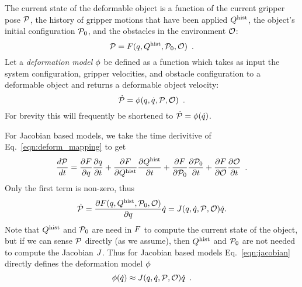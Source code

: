 The current state of the deformable object is a function of the current gripper pose $\mathcal{P}$, the history of gripper motions that have been applied $Q^{\textrm{hist}}$, the object's initial configuration $\mathcal{P}_0$, and the obstacles in the environment $\mathcal{O}$:
\begin{equation}
    \mathcal{P} = F(q, Q^{\textrm{hist}}, \mathcal{P}_0, \mathcal{O}) \enspace.
    \label{eqn:deform_mapping}
\end{equation}
Let a \textit{deformation model} $\phi$ be defined as a function which takes as input the system configuration, gripper velocities, and obstacle configuration to a deformable object and returns a deformable object velocity:
\begin{equation}
    \dot{\mathcal{P}} = \phi(q, \dot{q}, \mathcal{P}, \mathcal{O}) \enspace .
\end{equation}
For brevity this will frequently be shortened to $\dot{\mathcal{P}} = \phi(\dot{q})$.

For Jacobian based models, we take the time derivitive of Eq.~\eqref{eqn:deform_mapping} to get
\begin{equation}
\frac{d \mathcal{P}}{d t} = 
    \frac{\partial F}{\partial q}  \frac{\partial q}{\partial t} + 
    \frac{\partial F}{\partial Q^{\textrm{hist}}}\frac{\partial Q^{\textrm{hist}}}{\partial t} + 
    \frac{\partial F}{\partial \mathcal{P}_0} \frac{\partial \mathcal{P}_0}{\partial t} +
    \frac{\partial F}{\partial \mathcal{O}}       \frac{\partial \mathcal{O}}{\partial t} \enspace .
\end{equation}
Only the first term is non-zero, thus
\begin{equation}
    \dot{\mathcal{P}} = \frac{\partial F(q, Q^{\textrm{hist}}, \mathcal{P}_0, \mathcal{O})}{\partial q} \dot{q} = J(q, \dot{q}, \mathcal{P}, \mathcal{O}) \dot{q}.
    \label{eqn:jacobian}
\end{equation}
Note that $Q^{\textrm{hist}}$ and $\mathcal{P}_0$ are need in $F$ to compute the current state of the object, but if we can sense $\mathcal{P}$ directly (as we assume), then $Q^{\textrm{hist}}$ and $\mathcal{P}_0$ are not needed to compute the Jacobian $J$. Thus for Jacobian based models Eq.~\eqref{eqn:jacobian} directly defines the deformation model $\phi$
\begin{equation}
    \phi(\dot{q}) \approx J(q, \dot{q}, \mathcal{P}, \mathcal{O}) \dot{q} \enspace.
    \label{eqn:jacobianforwardfunction}
\end{equation}

